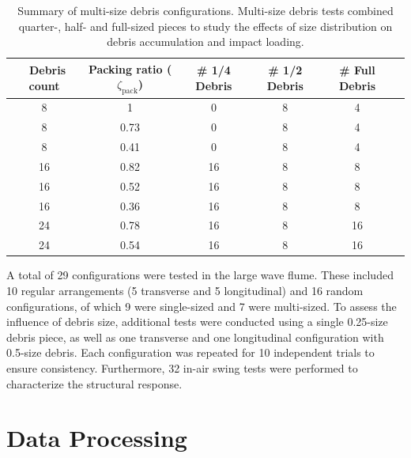 \documentclass{article}
\begin{document}
{\begin{table}[htbp]
    \centering
    \caption{Summary of multi-size debris configurations. Multi-size debris tests combined quarter-, half- and full-sized pieces to study the effects of size distribution on debris accumulation and impact loading.}
    \label{tab:multi_size_configs}
    \sffamily
    \begin{tabular}{cccccc}
        \toprule
        \ Debris count & Packing ratio ($\zeta_{\mathrm{pack}}$) & \# 1/4 Debris & \# 1/2 Debris & \# Full Debris \\
        \midrule
         8   & 1 & 0 & 8 & 4 \\
         8   & 0.73 & 0 & 8 & 4 \\
         8   & 0.41 & 0 & 8 & 4 \\
        16   & 0.82 & 16  & 8 & 8 \\
        16   & 0.52 & 16  & 8 & 8 \\
        16   & 0.36 & 16  & 8 & 8 \\
        24   & 0.78 & 16  & 8 & 16 \\
        24   & 0.54 & 16  & 8 & 16 \\
        \bottomrule
    \end{tabular}
    \normalfont
\end{table}

A total of 29 configurations were tested in the large wave flume. These included 10 regular arrangements (5 transverse and 5 longitudinal) and 16 random configurations, of which 9 were single-sized and 7 were multi-sized. To assess the influence of debris size, additional tests were conducted using a single 0.25-size debris piece, as well as one transverse and one longitudinal configuration with 0.5-size debris. Each configuration was repeated for 10 independent trials to ensure consistency. Furthermore, 32 in-air swing tests were performed to characterize the structural response.

\section{Data Processing}

}
\end{document}
